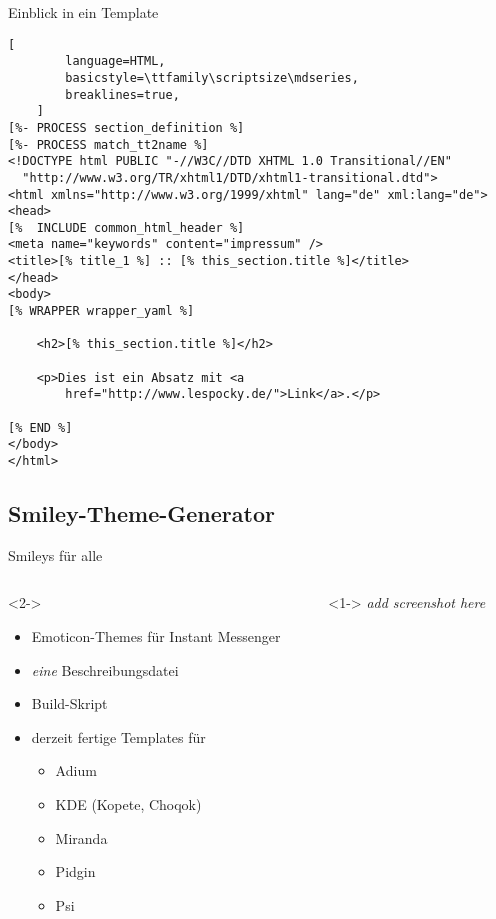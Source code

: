 \documentclass[hyperref={pdfpagelabels=false}]{beamer}
\begin{document}
\begin{frame}[fragile]{Einblick in ein Template}
    \begin{lstlisting}[
        language=HTML,
        basicstyle=\ttfamily\scriptsize\mdseries,
        breaklines=true,
    ]
[%- PROCESS section_definition %]
[%- PROCESS match_tt2name %]
<!DOCTYPE html PUBLIC "-//W3C//DTD XHTML 1.0 Transitional//EN"
  "http://www.w3.org/TR/xhtml1/DTD/xhtml1-transitional.dtd">
<html xmlns="http://www.w3.org/1999/xhtml" lang="de" xml:lang="de">
<head>
[%  INCLUDE common_html_header %]
<meta name="keywords" content="impressum" />
<title>[% title_1 %] :: [% this_section.title %]</title>
</head>
<body>
[% WRAPPER wrapper_yaml %]

    <h2>[% this_section.title %]</h2>

    <p>Dies ist ein Absatz mit <a 
        href="http://www.lespocky.de/">Link</a>.</p>

[% END %]
</body>
</html>
    \end{lstlisting}
\end{frame}

\subsection{Smiley-Theme-Generator}

\begin{frame}{Smileys für alle}
    \begin{columns}
        \begin{column}{0.6\textwidth}<2->
            \begin{itemize}
                \item Emoticon-Themes für Instant Messenger
                \item \emph{eine} Beschreibungsdatei
                \item Build-Skript
                \item derzeit fertige Templates für
                    \begin{itemize}
                        \item Adium
                        \item KDE (Kopete, Choqok)
                        \item Miranda
                        \item Pidgin
                        \item Psi
                    \end{itemize}
            \end{itemize}
        \end{column}
        \begin{column}{0.4\textwidth}<1->
            \emph{add screenshot here}
        \end{column}
    \end{columns}
\end{frame}
\end{document}
